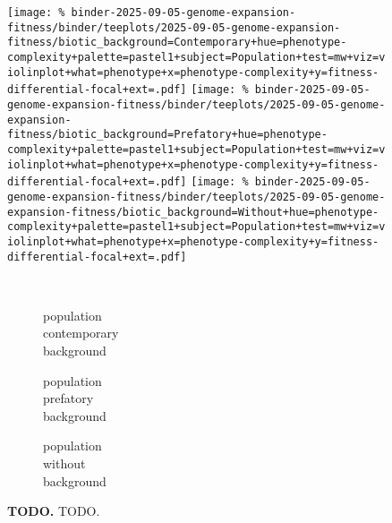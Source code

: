 \begin{figure}
\begin{minipage}{\linewidth}
\texttt{[image: \%
binder-2025-09-05-genome-expansion-fitness/binder/teeplots/2025-09-05-genome-expansion-fitness/biotic\_background=Contemporary+hue=phenotype-complexity+palette=pastel1+subject=Population+test=mw+viz=violinplot+what=phenotype+x=phenotype-complexity+y=fitness-differential-focal+ext=.pdf]}
\texttt{[image: \%
binder-2025-09-05-genome-expansion-fitness/binder/teeplots/2025-09-05-genome-expansion-fitness/biotic\_background=Prefatory+hue=phenotype-complexity+palette=pastel1+subject=Population+test=mw+viz=violinplot+what=phenotype+x=phenotype-complexity+y=fitness-differential-focal+ext=.pdf]}%
\texttt{[image: \%
binder-2025-09-05-genome-expansion-fitness/binder/teeplots/2025-09-05-genome-expansion-fitness/biotic\_background=Without+hue=phenotype-complexity+palette=pastel1+subject=Population+test=mw+viz=violinplot+what=phenotype+x=phenotype-complexity+y=fitness-differential-focal+ext=.pdf]}

\vspace{-1ex}

\begin{subfigure}{0.135\linewidth}
~
\end{subfigure}%
\begin{subfigure}{0.305\linewidth}
    \centering
    \caption{\footnotesize population\\contemporary\\background}
    \label{fig:fitness-pcomplexity:population-contemporary}
\end{subfigure}%
\begin{subfigure}{0.305\linewidth}
    \centering
    \caption{\footnotesize population\\prefatory\\background}
    \label{fig:fitness-pcomplexity:population-prefatory}
\end{subfigure}%
\begin{subfigure}{0.255\linewidth}
    \centering
    \caption{\footnotesize population\\without\\background}
    \label{fig:fitness-pcomplexity:population-without}
\end{subfigure}
\end{minipage}


\caption{
    \textbf{TODO.}
    \footnotesize
    TODO.
}
\label{fig:fitness-pcomplexity}

\end{figure}
